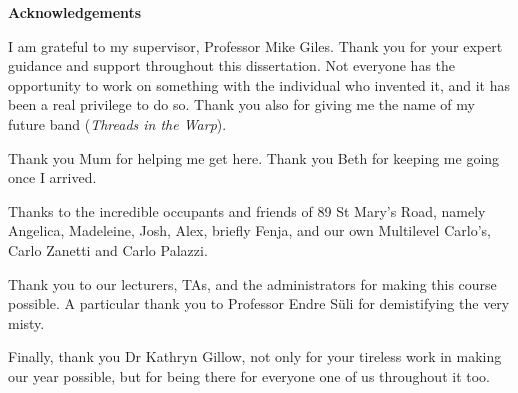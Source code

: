 \begin{center}
  \Huge\bfseries Acknowledgements
\end{center}
\vspace{2em}

I am grateful to my supervisor, Professor Mike Giles. Thank you for your 
expert guidance and support 
throughout this dissertation. Not everyone has the opportunity to work on 
something with the individual who invented it, and it has been a
real privilege to do so. 
Thank you also for giving me the name of my future band (\emph{Threads in the Warp}).

Thank you Mum for helping me get here. Thank you Beth for keeping 
me going once I arrived.

Thanks to the incredible occupants and friends of 89 St Mary's Road, namely Angelica, Madeleine,
Josh, Alex, briefly Fenja, and our own Multilevel Carlo's, Carlo Zanetti and Carlo Palazzi.

Thank you to our lecturers, TAs, and the administrators for making this course possible.
A particular thank you to Professor Endre Süli for demistifying the very misty.

Finally, thank you Dr Kathryn Gillow, not only for your tireless work in making our 
year possible, but for being there for everyone one of us throughout it too.
